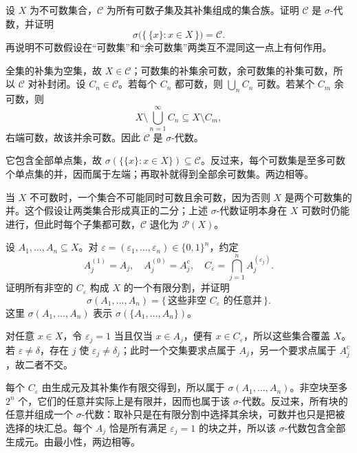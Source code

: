 \begin{exercise}
\label{b1:ex:02}
设 \(X\) 为不可数集合，\(\mathcal C\) 为所有可数子集及其补集组成的集合族。证明 \(\mathcal C\) 是 \(\sigma\)-代数，并证明
\[
\sigma\bigl(\bigl\{\,\{x\}:x\in X\,\bigr\}\bigr)=\mathcal C.
\]
再说明不可数假设在“可数集”和“余可数集”两类互不混同这一点上有何作用。
\end{exercise}
\begin{solution}
全集的补集为空集，故 \(X\in\mathcal C\)；可数集的补集余可数，余可数集的补集可数，所以 \(\mathcal C\) 对补封闭。设 \(C_n\in\mathcal C\)。若每个 \(C_n\) 都可数，则 \(\bigcup_nC_n\) 可数。若某个 \(C_m\) 余可数，则
\[
X\setminus\bigcup_{n=1}^{\infty}C_n
\subseteq X\setminus C_m,
\]
右端可数，故该并余可数。因此 \(\mathcal C\) 是 \(\sigma\)-代数。

它包含全部单点集，故
\(
\sigma(\bigl\{\{x\}:x\in X\bigr\})\subseteq\mathcal C
\)。反过来，每个可数集是至多可数个单点集的并，因而属于左端；再取补就得到全部余可数集。两边相等。

当 \(X\) 不可数时，一个集合不可能同时可数且余可数，因为否则 \(X\) 是两个可数集的并。这个假设让两类集合形成真正的二分；上述 \(\sigma\)-代数证明本身在 \(X\) 可数时仍能进行，但此时每个子集都可数，\(\mathcal C\) 退化为 \(\mathcal P(X)\)。
\end{solution}

\begin{exercise}
\label{b1:ex:03}
设 \(A_1,\ldots,A_n\subseteq X\)。对 \(\varepsilon=(\varepsilon_1,\ldots,\varepsilon_n)\in\{0,1\}^n\)，约定
\[
A_j^{(1)}=A_j,
\quad
A_j^{(0)}=A_j^{\mathrm c},
\quad
C_{\varepsilon}=\bigcap_{j=1}^{n}A_j^{(\varepsilon_j)}.
\]
证明所有非空的 \(C_{\varepsilon}\) 构成 \(X\) 的一个有限分割，并证明
\[
\sigma(A_1,\ldots,A_n)
=\{\,\text{这些非空 }C_{\varepsilon}\text{ 的任意并}\,\}.
\]
这里 \(\sigma(A_1,\ldots,A_n)\) 表示 \(\sigma(\{A_1,\ldots,A_n\})\)。
\end{exercise}
\begin{solution}
对任意 \(x\in X\)，令 \(\varepsilon_j=1\) 当且仅当 \(x\in A_j\)，便有 \(x\in C_{\varepsilon}\)，所以这些集合覆盖 \(X\)。若 \(\varepsilon\neq\delta\)，存在 \(j\) 使 \(\varepsilon_j\neq\delta_j\)；此时一个交集要求点属于 \(A_j\)，另一个要求点属于 \(A_j^{\mathrm c}\)，故二者不交。

每个 \(C_{\varepsilon}\) 由生成元及其补集作有限交得到，所以属于 \(\sigma(A_1,\ldots,A_n)\)。非空块至多 \(2^n\) 个，它们的任意并实际上是有限并，因而也属于该 \(\sigma\)-代数。反过来，所有块的任意并组成一个 \(\sigma\)-代数：取补只是在有限分割中选择其余块，可数并也只是把被选择的块汇总。每个 \(A_j\) 恰是所有满足 \(\varepsilon_j=1\) 的块之并，所以该 \(\sigma\)-代数包含全部生成元。由最小性，两边相等。
\end{solution}

